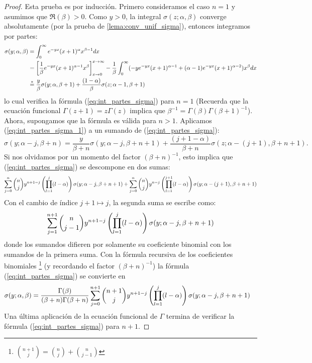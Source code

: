 \documentclass[../../tesis_maestria]{subfiles}
\begin{document}
\begin{proof}
  Esta prueba es por inducci\'on. Primero consideramos el caso $n=1$ y asumimos que $\Re(\beta)>0$.
  Como $y>0$, la integral $\sigma(z;\alpha,\beta)$ converge absolutamente (por la prueba de
  \ref{lema:conv_unif_sigma}), entonces integramos por partes:
  \begin{align}
    \sigma(y;\alpha,\beta)
    &=\int_0^{\infty}e^{-yx}(x+1)^{\alpha}x^{\beta-1}dx \nonumber\\
    &=\left[\frac{1}{\beta}e^{-yx}(x+1)^{\alpha-1}x^{\beta}\right]_{x\rightarrow0}^{x\rightarrow\infty}-\frac{1}{\beta}
      \int_0^{\infty}(-ye^{-yx}(x+1)^{\alpha-1}+(\alpha-1)e^{-yx}(x+1)^{\alpha-2})x^{\beta}dx\nonumber\\
    &\overset{*}{=}\frac{y}{\beta}\sigma(y;\alpha,\beta+1)+
      \frac{(1-\alpha)}{\beta}\sigma(z;\alpha-1,\beta+1)\label{eq:int_partes_sigma_1}
  \end{align}
  lo cual verifica la f\'ormula (\ref{eq:int_partes_sigma}) para $n=1$ (Recuerda que la ecuaci\'on
  funcional $\Gamma(z+1)=z\Gamma(z)$ implica que $\beta^{-1}=\Gamma(\beta)\Gamma(\beta+1)^{-1}$).
  Ahora, supongamos que la f\'ormula es v\'alida para $n>1$. Aplicamos (\ref{eq:int_partes_sigma_1})
  a un sumando de (\ref{eq:int_partes_sigma}):
  \[
    \sigma(y;\alpha-j,\beta+n)=\frac{y}{\beta+n}\sigma(y;\alpha-j,\beta+n+1)+
      \frac{(j+1-\alpha)}{\beta+n}\sigma(z;\alpha-(j+1),\beta+n+1).
  \]
  Si nos olvidamos por un momento del factor $(\beta+n)^{-1}$, esto implica que
  (\ref{eq:int_partes_sigma}) se descompone en dos sumas:
  \[
    \sum_{j=0}^n\binom{n}{j}y^{n+1-j}\left( \prod_{l=1}^j(l-\alpha) \right)\sigma(y;\alpha-j,\beta+n+1)+
    \sum_{j=0}^n\binom{n}{j}y^{n-j}\left( \prod_{l=1}^{j+1}(l-\alpha) \right)\sigma(y;\alpha-(j+1),\beta+n+1)
  \]
  Con el cambio de \'indice $j+1\mapsto j$, la segunda suma se escribe como:
  \[
    \sum_{j=1}^{n+1}\binom{n}{j-1}y^{n+1-j}
    \left( \prod_{l=1}^{j}(l-\alpha) \right)\sigma(y;\alpha-j,\beta+n+1)
  \]
  donde los  sumandos difieren por solamente su coeficiente binomial con los sumandos de la primera
  suma. Con la f\'ormula recursiva de los coeficientes binomiales%
  \footnote{$\binom{n+1}{j}=\binom{n}{j}+\binom{n}{j-1}$} (y recordando el factor $(\beta+n)^{-1}$)
  la f\'ormula (\ref{eq:int_partes_sigma}) se convierte en
  \begin{align*}
    \sigma(y;\alpha,\beta)
    &=\frac{\Gamma(\beta)}{(\beta+n)\Gamma(\beta+n)}\sum_{j=0}^{n+1}
    \binom{n+1}{j}y^{n+1-j}\left( \prod_{l=1}^j(l-\alpha) \right)\sigma(y;\alpha-j,\beta+n+1)
  \end{align*}
  Una \'ultima aplicaci\'on de la ecuaci\'on funcional de $\Gamma$ termina de verificar la
  f\'ormula (\ref{eq:int_partes_sigma}) para $n+1$.
\end{proof}
\end{document}
